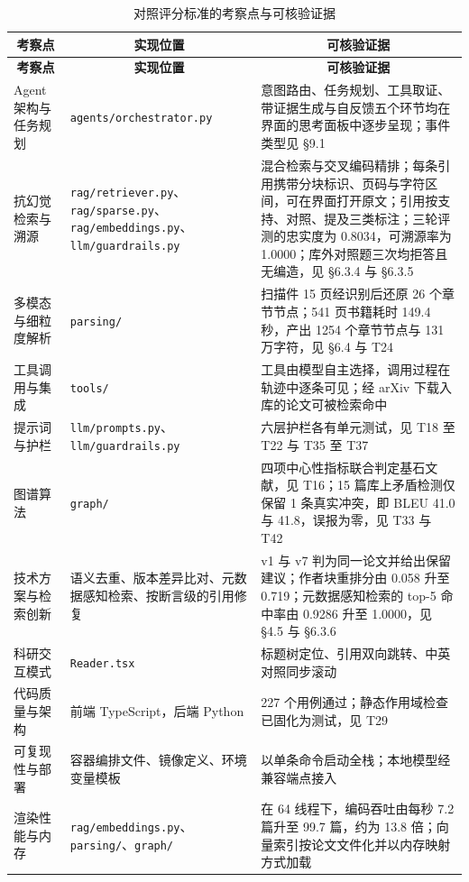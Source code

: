 \documentclass[UTF8,fontset=windows,zihao=5,a4paper]{ctexart}
\begin{document}
\begin{longtable}{@{}p{}p{}p{}@{}}
\caption{对照评分标准的考察点与可核验证据}\\
\toprule
\multicolumn{1}{c}{\textbf{考察点}} & \multicolumn{1}{c}{\textbf{实现位置}} & \multicolumn{1}{c}{\textbf{可核验证据}} \\
\midrule
\endfirsthead
\toprule
\multicolumn{1}{c}{\textbf{考察点}} & \multicolumn{1}{c}{\textbf{实现位置}} & \multicolumn{1}{c}{\textbf{可核验证据}} \\
\midrule
\endhead
\bottomrule
\endfoot
Agent 架构与任务规划 & \texttt{agents/orchestrator.py} & 意图路由、任务规划、工具取证、带证据生成与自反馈五个环节均在界面的思考面板中逐步呈现；事件类型见 §9.1 \\
抗幻觉检索与溯源 & \texttt{rag/retriever.py}、\texttt{rag/sparse.py}、\texttt{rag/embeddings.py}、\texttt{llm/guardrails.py} & 混合检索与交叉编码精排；每条引用携带分块标识、页码与字符区间，可在界面打开原文；引用按支持、对照、提及三类标注；三轮评测的忠实度为 0.8034，可溯源率为 1.0000；库外对照题三次均拒答且无编造，见 §6.3.4 与 §6.3.5 \\
多模态与细粒度解析 & \texttt{parsing/} & 扫描件 15 页经识别后还原 26 个章节节点；541 页书籍耗时 149.4 秒，产出 1254 个章节节点与 131 万字符，见 §6.4 与 T24 \\
工具调用与集成 & \texttt{tools/} & 工具由模型自主选择，调用过程在轨迹中逐条可见；经 arXiv 下载入库的论文可被检索命中 \\
提示词与护栏 & \texttt{llm/prompts.py}、\texttt{llm/guardrails.py} & 六层护栏各有单元测试，见 T18 至 T22 与 T35 至 T37 \\
图谱算法 & \texttt{graph/} & 四项中心性指标联合判定基石文献，见 T16；15 篇库上矛盾检测仅保留 1 条真实冲突，即 BLEU 41.0 与 41.8，误报为零，见 T33 与 T42 \\
技术方案与检索创新 & 语义去重、版本差异比对、元数据感知检索、按断言级的引用修复 & v1 与 v7 判为同一论文并给出保留建议；作者块重排分由 0.058 升至 0.719；元数据感知检索的 top-5 命中率由 0.9286 升至 1.0000，见 §4.5 与 §6.3.6 \\
科研交互模式 & \texttt{Reader.tsx} & 标题树定位、引用双向跳转、中英对照同步滚动 \\
代码质量与架构 & 前端 TypeScript，后端 Python & 227 个用例通过；静态作用域检查已固化为测试，见 T29 \\
可复现性与部署 & 容器编排文件、镜像定义、环境变量模板 & 以单条命令启动全栈；本地模型经兼容端点接入 \\
渲染性能与内存 & \texttt{rag/embeddings.py}、\texttt{parsing/}、\texttt{graph/} & 在 64 线程下，编码吞吐由每秒 7.2 篇升至 99.7 篇，约为 13.8 倍；向量索引按论文文件化并以内存映射方式加载 \\

\end{longtable}
\end{document}
